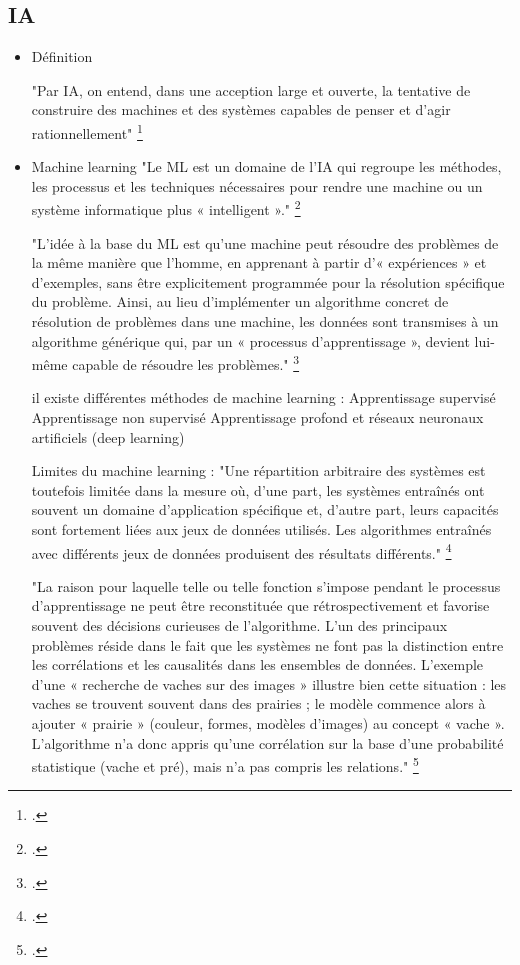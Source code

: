 \subsection{IA}

\begin{itemize}
	\item Définition
	
	"Par IA, on entend, dans une acception large et ouverte, la tentative de construire des
	machines et des systèmes capables de penser et d'agir rationnellement"
	\footcite{zotero-item-584}
	
	\item Machine learning 
	"Le ML est un domaine de l'IA qui regroupe les méthodes, les processus et les techniques
	nécessaires pour rendre une machine ou un système informatique plus « intelligent »."
	\footcite{zotero-item-584}
	
	"L'idée
	à la base du ML est qu'une machine peut résoudre des problèmes de la même manière que l'homme, en apprenant à partir d’« expériences » et d'exemples, sans être explicitement programmée pour la résolution spécifique du problème. Ainsi, au lieu d'implémenter un algorithme concret de résolution de problèmes dans une machine, les données sont transmises à un algorithme générique qui, par un « processus d'apprentissage », devient
	lui-même capable de résoudre les problèmes."
	\footcite{zotero-item-584}
	
	il existe différentes méthodes de machine learning : 
	Apprentissage supervisé 
	Apprentissage non supervisé 
	Apprentissage profond et réseaux neuronaux artificiels (deep learning)
	
	Limites du machine learning : 
	"Une répartition arbitraire des systèmes est toutefois limitée dans la mesure où, d’une part, les systèmes entraînés ont souvent un domaine d'application spécifique
	et, d’autre part, leurs capacités sont fortement liées aux jeux de données utilisés. Les algorithmes entraînés avec différents jeux de données produisent des résultats
	différents."
	\footcite{zotero-item-584}
	
	"La raison pour laquelle telle ou telle fonction s'impose
	pendant le processus d'apprentissage ne peut être reconstituée que	rétrospectivement et favorise souvent des décisions curieuses de l'algorithme. L'un	des principaux problèmes réside dans le fait que les systèmes ne font pas la	distinction entre les corrélations et les causalités dans les ensembles de données.	L'exemple d'une « recherche de vaches sur des images » illustre bien cette situation	: les vaches se trouvent souvent dans des prairies ; le modèle commence alors à	ajouter « prairie » (couleur, formes, modèles d'images) au concept « vache ». L'algorithme n'a donc appris qu'une corrélation sur la base d'une probabilité statistique (vache et pré), mais n'a pas compris les relations."
	\footcite{zotero-item-584}
	

\end{itemize}
